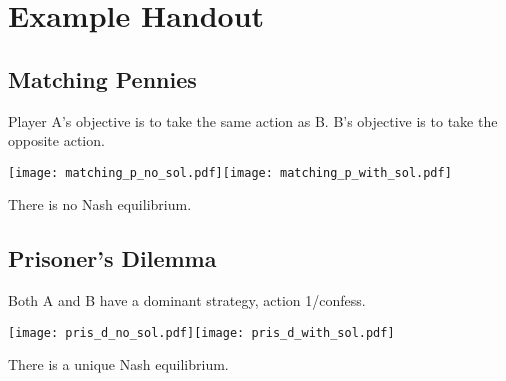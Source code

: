 \documentclass[12pt,notitlepage]{article}
\begin{document}
\section*{Example Handout}

\subsection*{Matching Pennies}

Player A's objective is to take the same action as B. B's objective is to take the opposite action.

\begin{center}
\texttt{[image: matching\_p\_no\_sol.pdf]}\texttt{[image: matching\_p\_with\_sol.pdf]}
\end{center}

There is no Nash equilibrium. 

\subsection*{Prisoner's Dilemma}

Both A and B have a dominant strategy, action 1/confess. 

\begin{center}
\texttt{[image: pris\_d\_no\_sol.pdf]}\texttt{[image: pris\_d\_with\_sol.pdf]}
\end{center}

There is a unique Nash equilibrium. 
\end{document}
